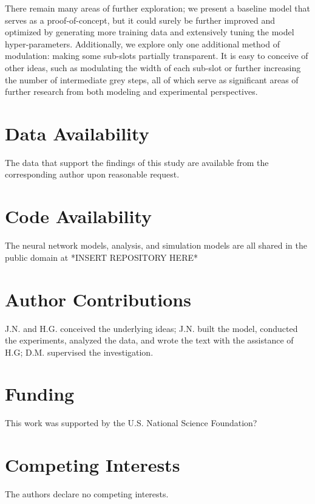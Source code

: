 \documentclass[11pt]{article}
\begin{document}
\noindent There remain many areas of further exploration; we present a baseline model that serves as a proof-of-concept, but it could surely be further improved and optimized by generating more training data and extensively tuning the model hyper-parameters. Additionally, we explore only one additional method of modulation: making some sub-slots partially transparent. It is easy to conceive of other ideas, such as modulating the width of each sub-slot or further increasing the number of intermediate grey steps, all of which serve as significant areas of further research from both modeling and experimental perspectives.

\section*{Data Availability}
The data that support the findings of this study are available from the corresponding author upon reasonable request.

\section*{Code Availability}
The neural network models, analysis, and simulation models are all shared in the public domain at *INSERT REPOSITORY HERE*

\section*{Author Contributions}
J.N. and H.G. conceived the underlying ideas; J.N. built the model, conducted the experiments, analyzed the data, and wrote the text with the assistance of H.G; D.M. supervised the investigation.

\section*{Funding}
This work was supported by the U.S. National Science Foundation?

\section*{Competing Interests}
The authors declare no competing interests. 



\end{document}
